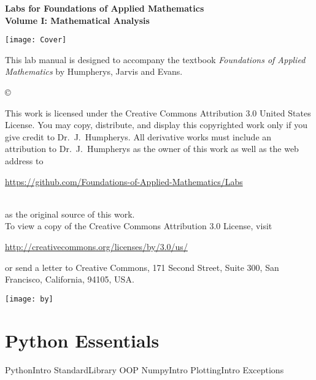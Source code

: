 \documentclass[nociteref]{SIAM-GH-book}
\begin{document}

\thispagestyle{empty} %

\begin{center} 
{\huge \bf Labs for Foundations of Applied Mathematics} \\
\vspace{5mm}
{\Large \bf Volume I: Mathematical Analysis}
\vspace{20mm}

\texttt{[image: Cover]}
\end{center}
\frontmatter



\begin{thepreface} %

This lab manual is designed to accompany the textbook \emph{Foundations of Applied Mathematics} by Humpherys, Jarvis and Evans.

\vfill
\copyright{This work is licensed under the Creative Commons Attribution 3.0 United States
License.  You may copy, distribute, and display this copyrighted work only if you give
credit to Dr.~J.~Humpherys. All derivative works must include an attribution to Dr.~J.~Humpherys as the owner of this work as well as the web address to
\\\centerline{\url{https://github.com/Foundations-of-Applied-Mathematics/Labs}}\\as the original source of this work.
\\To view a copy of the Creative Commons Attribution 3.0 License, visit
\\\centerline{\url{http://creativecommons.org/licenses/by/3.0/us/}} or send a letter to Creative Commons, 171 Second Street, Suite 300, San Francisco, California, 94105, USA.}

\vfill
\centering\texttt{[image: by]}
\vfill
\end{thepreface}

\setcounter{tocdepth}{1}
\tableofcontents

\mainmatter %

\part{Python Essentials} %
{PythonIntro}
{StandardLibrary}
{OOP}
{NumpyIntro}
{PlottingIntro}
{Exceptions}
\end{document}
